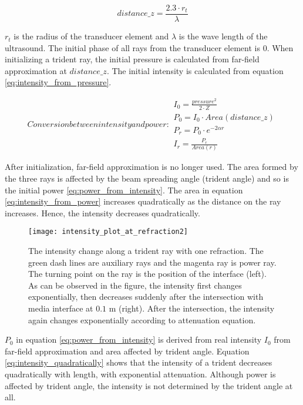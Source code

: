 \begin{equation} \label{eq:distancz}
    distance\_z=\frac{2.3 \cdot r_t}{\lambda}
\end{equation}

$r_t$ is the radius of the transducer element and $\lambda$ is the wave length of the ultrasound. The initial phase of all rays from the transducer element is 0. When initializing a trident ray, the initial pressure is calculated from far-field approximation at $distance\_z$. The initial intensity is calculated from equation \ref{eq:intensity_from_pressure}.

\begin{subequations}
    Conversion between intensity and power:
    \begin{align} 
        I_0 = \frac{pressure^2}{2 \cdot Z} \label{eq:intensity_from_pressure}\\
        P_0 = I_0 \cdot Area(distance\_z) \label{eq:power_from_intensity}\\
        P_{r} = P_0 \cdot e^{-2 \alpha r} \label{eq:power_decay}\\
        I_{r} = \frac{P_r}{Area(r)} \label{eq:intensity_from_power}
    \end{align}
\end{subequations}

After initialization, far-field approximation is no longer used. The area formed by the three rays is affected by the beam spreading angle (trident angle) and so is the initial power \ref{eq:power_from_intensity}. The area in equation \ref{eq:intensity_from_power} increases quadratically as the distance on the ray increases. Hence, the intensity decreases quadratically. 

\begin{figure}[h]
    \centering
    \texttt{[image: intensity\_plot\_at\_refraction2]}
    \caption{The intensity change along a trident ray  with one refraction. The green dash lines are auxiliary rays and the magenta ray is power ray. The turning point on the ray is the position of the interface (left). As can be observed in the figure, the intensity first changes exponentially, then decreases suddenly after the intersection with media interface at $0.1$ m (right). After the intersection, the intensity again changes exponentially according to attenuation equation.}
    \label{fig:intensity_plot_at_refraction2}
\end{figure}

$P_0$ in equation \ref{eq:power_from_intensity} is derived from real intensity $I_0$ from far-field approximation and area affected by trident angle. Equation \ref{eq:intensity_quadratically} shows that the intensity of a trident decreases quadratically with length, with exponential attenuation. Although power is affected by trident angle, the intensity is not determined by the trident angle at all.

